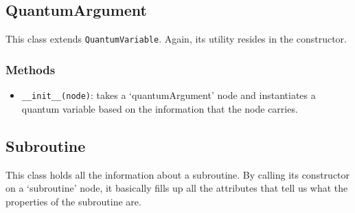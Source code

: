 \documentclass[12pt,a4paper]{report}
\theoremstyle{definition}
\theoremstyle{definition}
\theoremstyle{definition}
\begin{document}
\subsection{QuantumArgument}
This class extends \texttt{QuantumVariable}.
Again, its utility resides in the constructor.
\subsubsection{Methods}
\begin{itemize}
    \itemsep 0em
    \item \texttt{\_\_init\_\_(node)}: takes a `quantumArgument' node and instantiates a quantum variable based on the information that the node carries.
\end{itemize}

\subsection{Subroutine}
This class holds all the information about a subroutine. By calling its constructor on a `subroutine' node, it basically fills up all the attributes that tell us what the properties of the subroutine are.
\end{document}
